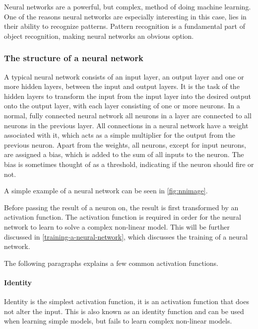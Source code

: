 Neural networks are a powerful, but complex, method of doing machine learning.
One of the reasons neural networks are especially interesting in this case, lies in their ability to recognize patterns.
Pattern recognition is a fundamental part of object recognition, making neural networks an obvious option.

\subsubsection{The structure of a neural network}
A typical neural network consists of an input layer, an output layer and one or more hidden layers, between the input and output layers.
It is the task of the hidden layers to transform the input from the input layer into the desired output onto the output layer, with each layer consisting of one or more neurons.
In a normal, fully connected neural network all neurons in a layer are connected to all neurons in the previous layer.
All connections in a neural network have a weight associated with it, which acts as a simple multiplier for the output from the previous neuron. 
Apart from the weights, all neurons, except for input neurons, are assigned a bias, which is added to the sum of all inputs to the neuron. 
The bias is sometimes thought of as a threshold, indicating if the neuron should fire or not.

A simple example of a neural network can be seen in \autoref{fig:nnimage}.


Before passing the result of a neuron on, the result is first transformed by an activation function. 
The activation function is required in order for the neural network to learn to solve a complex non-linear model. 
This will be further discussed in \autoref{training-a-neural-network}, which discusses the training of a neural network.

The following paragraphs explains a few common activation functions.
\paragraph{Identity}
Identity is the simplest activation function, it is an activation function that does not alter the input. 
This is also known as an identity function and can be used when learning simple models, but fails to learn complex non-linear models.

